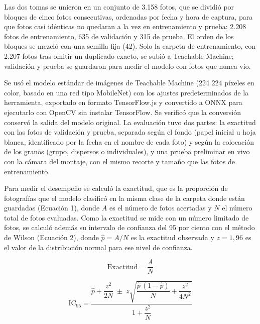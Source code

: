 Las dos tomas se unieron en un conjunto de 3.158 fotos, que se dividió por bloques de cinco fotos consecutivas, ordenadas por fecha y hora de captura, para que fotos casi idénticas no quedaran a la vez en entrenamiento y prueba: 2.208 fotos de entrenamiento, 635 de validación y 315 de prueba. El orden de los bloques se mezcló con una semilla fija (42). Solo la carpeta de entrenamiento, con 2.207 fotos tras omitir un duplicado exacto, se subió a Teachable Machine; validación y prueba se guardaron para medir el modelo con fotos que nunca vio.

Se usó el modelo estándar de imágenes de Teachable Machine (224\,\texttimes\,224 píxeles en color, basado en una red tipo MobileNet) con los ajustes predeterminados de la herramienta, exportado en formato TensorFlow.js y convertido a ONNX para ejecutarlo con OpenCV sin instalar TensorFlow. Se verificó que la conversión conservó la salida del modelo original. La evaluación tuvo dos partes: la exactitud con las fotos de validación y prueba, separada según el fondo (papel inicial u hoja blanca, identificado por la fecha en el nombre de cada foto) y según la colocación de los granos (grupo, dispersos o individuales), y una prueba preliminar en vivo con la cámara del montaje, con el mismo recorte y tamaño que las fotos de entrenamiento.

Para medir el desempeño se calculó la exactitud, que es la proporción de fotografías que el modelo clasificó en la misma clase de la carpeta donde están guardadas (Ecuación 1), donde $A$ es el número de fotos acertadas y $N$ el número total de fotos evaluadas. Como la exactitud se mide con un número limitado de fotos, se calculó además su intervalo de confianza del 95 por ciento con el método de Wilson \citep{wilson1927} (Ecuación 2), donde $\hat{p}=A/N$ es la exactitud observada y $z=1{,}96$ es el valor de la distribución normal para ese nivel de confianza.

\begin{equation*}
\text{Exactitud}=\frac{A}{N}\tag*{[1]}
\end{equation*}

\begin{equation*}
\mathrm{IC}_{95}=\frac{\hat{p}+\dfrac{z^{2}}{2N}\;\pm\;z\sqrt{\dfrac{\hat{p}\,(1-\hat{p})}{N}+\dfrac{z^{2}}{4N^{2}}}}{1+\dfrac{z^{2}}{N}}\tag*{[2]}
\end{equation*}

